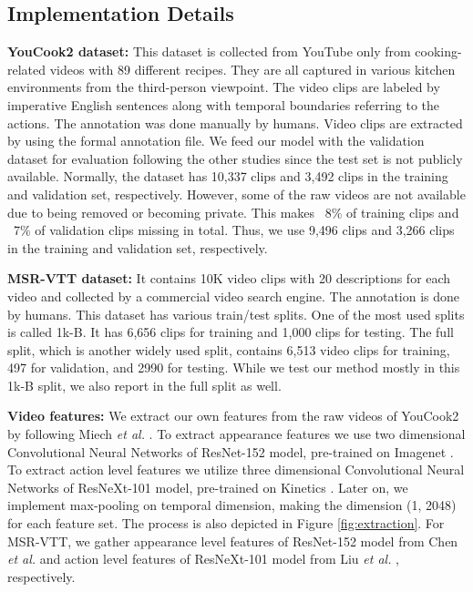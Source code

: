 \documentclass[lettersize,journal]{IEEEtran}
\begin{document}
\subsection{Implementation Details}

\textbf{YouCook2 dataset: } This dataset \cite{ZhXuCoAAAI18} is collected from YouTube only from cooking-related videos with 89 different recipes. They are all captured in various kitchen environments from the third-person viewpoint. The video clips are labeled by imperative English sentences along with temporal boundaries referring to the actions. The annotation was done manually by humans. Video clips are extracted by using the formal annotation file. We feed our model with the validation dataset for evaluation following the other studies since the test set is not publicly available. Normally, the dataset has 10,337 clips and 3,492 clips in the training and validation set, respectively. However, some of the raw videos are not available due to being removed or becoming private. This makes ~8\% of training clips and ~7\% of validation clips missing in total. Thus, we use 9,496 clips and 3,266 clips in the training and validation set, respectively.

\textbf{MSR-VTT dataset:} It \cite{xu2016msr-vtt} contains 10K video clips with 20 descriptions for each video and collected by a commercial video search engine. The annotation is done by humans. This dataset has various train/test splits. One of the most used splits is called 1k-B. It has 6,656 clips for training and 1,000 clips for testing. The full split, which is another widely used split, contains 6,513 video clips for training, 497 for validation, and 2990 for testing. While we test our method mostly in this 1k-B split, we also report in the full split as well.

\textbf{Video features:} We extract our own features from the raw videos of YouCook2 by following Miech \textit{et al.} \cite{miech19howto100m}. To extract appearance features we use two dimensional Convolutional Neural Networks of ResNet-152 \cite{2D_CNNs} model, pre-trained on Imagenet \cite{imagenet}. To extract action level features we utilize three dimensional Convolutional Neural Networks of ResNeXt-101 \cite{3D_CNNs} model, pre-trained on Kinetics \cite{kinetics}. Later on, we implement max-pooling on temporal dimension, making the dimension (1, 2048) for each feature set. The process is also depicted in Figure \ref{fig:extraction}. For MSR-VTT, we gather appearance level features of ResNet-152 model from Chen \textit{et al.} \cite{Chen_2020_CVPR} and action level features of ResNeXt-101 model from Liu \textit{et al.} \cite{Liu2019a}, respectively. 
\end{document}

